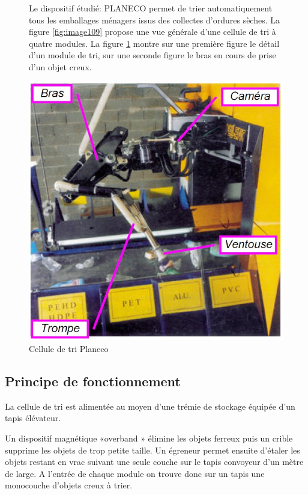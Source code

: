 \begin{figure}[htbp]
\begin{minipage}[c]{.4\linewidth}
Le dispositif étudié: PLANECO permet de trier automatiquement tous les emballages ménagers issus des collectes d'ordures sèches. La figure \ref{fig:image109} propose une vue générale d'une cellule de tri à quatre modules. La figure \ref{fig:image110} montre sur une première figure le détail d'un module de tri, sur une seconde figure le bras en cours de prise d'un objet creux.
\end{minipage}
\hfill
\begin{minipage}[c]{.55\linewidth}
\begin{center}
\includegraphics[width=0.9\linewidth]{img/planeco2.jpg}
\caption{Cellule de tri Planeco}
\label{fig:image110}
\end{center}
\end{minipage}
\end{figure}

\newpage

\subsection{Principe de fonctionnement}

La cellule de tri est alimentée au moyen d'une trémie de stockage équipée d'un tapis élévateur. 

Un dispositif magnétique «overband » élimine les objets ferreux puis un crible supprime les objets de trop petite taille. Un égreneur permet ensuite d'étaler les objets restant en vrac suivant une seule couche sur le tapis convoyeur d'un mètre de large. A l'entrée de chaque module on trouve donc sur un tapis une monocouche d'objets creux à trier.

